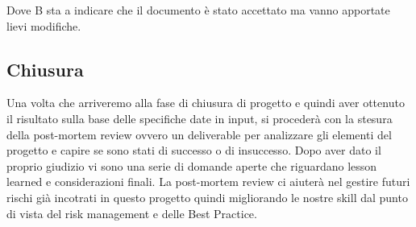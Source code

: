 Dove B sta a indicare che il documento \`{e} stato accettato ma vanno apportate lievi modifiche.

\subsection{Chiusura}
Una volta che arriveremo alla fase di chiusura di progetto e quindi aver ottenuto il risultato sulla base delle specifiche date in input, si proceder\`{a} con la stesura della post-mortem review ovvero un deliverable per analizzare gli elementi del progetto e capire se sono stati di successo o di insuccesso. Dopo aver dato il proprio giudizio vi sono una serie di domande aperte che riguardano lesson learned e considerazioni finali.
La post-mortem review ci aiuter\`{a} nel gestire futuri rischi gi\`{a} incotrati in questo progetto quindi migliorando le nostre skill dal punto di vista del risk management e delle Best Practice.
